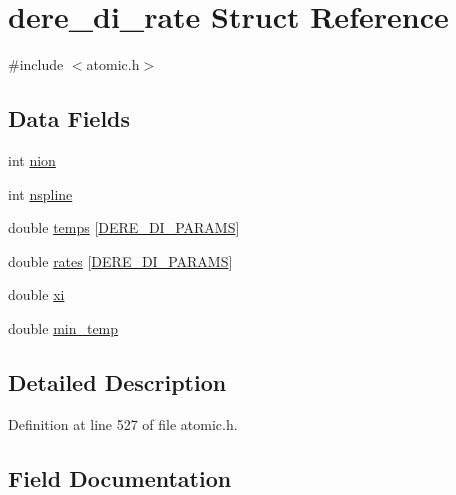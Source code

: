 \hypertarget{structdere__di__rate}{}\section{dere\+\_\+di\+\_\+rate Struct Reference}
\label{structdere__di__rate}


{\ttfamily \#include $<$atomic.\+h$>$}

\subsection*{Data Fields}
\begin{DoxyCompactItemize}
\item 
int \hyperlink{structdere__di__rate_ad3fcb19ca4d3aa30ac03534b6ab383f6}{nion}
\item 
int \hyperlink{structdere__di__rate_a6cf66a009bc483a7058ada0976ec1b0b}{nspline}
\item 
double \hyperlink{structdere__di__rate_a3018944b5c151094bad854661eb7aa31}{temps} \mbox{[}\hyperlink{atomic_8h_aefebf0841dbe3a3fded75a69142f8fa2}{D\+E\+R\+E\+\_\+\+D\+I\+\_\+\+P\+A\+R\+A\+MS}\mbox{]}
\item 
double \hyperlink{structdere__di__rate_a50668066ca7379e573d226ccbf0ddf8b}{rates} \mbox{[}\hyperlink{atomic_8h_aefebf0841dbe3a3fded75a69142f8fa2}{D\+E\+R\+E\+\_\+\+D\+I\+\_\+\+P\+A\+R\+A\+MS}\mbox{]}
\item 
double \hyperlink{structdere__di__rate_a356c84714c48be9df082926edf7c4dc9}{xi}
\item 
double \hyperlink{structdere__di__rate_af384996329ba16e93b03f92606756075}{min\+\_\+temp}
\end{DoxyCompactItemize}


\subsection{Detailed Description}


Definition at line 527 of file atomic.\+h.



\subsection{Field Documentation}
\mbox{\label{structdere__di__rate_af384996329ba16e93b03f92606756075}} 
